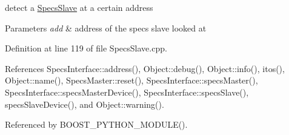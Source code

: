 detect a \hyperlink{classSpecsSlave}{Specs\+Slave} at a certain address


\begin{DoxyParams}{Parameters}
{\em add} & address of the specs slave looked at \\
\hline
\end{DoxyParams}


Definition at line 119 of file Specs\+Slave.\+cpp.



References Specs\+Interface\+::address(), Object\+::debug(), Object\+::info(), itos(), Object\+::name(), Specs\+Master\+::reset(), Specs\+Interface\+::specs\+Master(), Specs\+Interface\+::specs\+Master\+Device(), Specs\+Interface\+::specs\+Slave(), specs\+Slave\+Device(), and Object\+::warning().



Referenced by B\+O\+O\+S\+T\+\_\+\+P\+Y\+T\+H\+O\+N\+\_\+\+M\+O\+D\+U\+L\+E().


